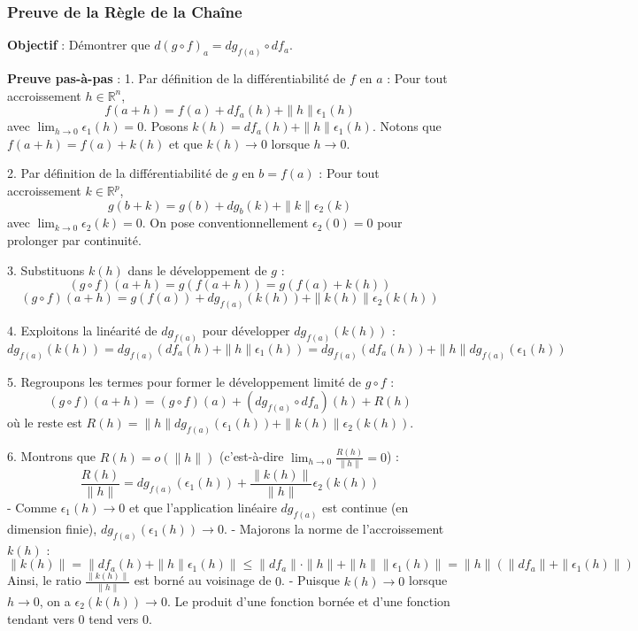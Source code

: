 \documentclass[11pt,a4paper]{article}
\begin{document}
\subsubsection{Preuve de la Règle de la Chaîne}

\textbf{Objectif} : Démontrer que $d(g \circ f)_a = dg_{f(a)} \circ df_a$.

\textbf{Preuve pas-à-pas} :
1. Par définition de la différentiabilité de $f$ en $a$ :
   Pour tout accroissement $h \in \mathbb{R}^n$,
   $$ f(a+h) = f(a) + df_a(h) + \|h\|\epsilon_1(h) $$
   avec $\lim_{h \to 0} \epsilon_1(h) = 0$.
   Posons $k(h) = df_a(h) + \|h\|\epsilon_1(h)$. Notons que $f(a+h) = f(a) + k(h)$ et que $k(h) \to 0$ lorsque $h \to 0$.

2. Par définition de la différentiabilité de $g$ en $b = f(a)$ :
   Pour tout accroissement $k \in \mathbb{R}^p$,
   $$ g(b+k) = g(b) + dg_b(k) + \|k\|\epsilon_2(k) $$
   avec $\lim_{k \to 0} \epsilon_2(k) = 0$. On pose conventionnellement $\epsilon_2(0) = 0$ pour prolonger par continuité.

3. Substituons $k(h)$ dans le développement de $g$ :
   $$ (g \circ f)(a+h) = g(f(a+h)) = g(f(a) + k(h)) $$
   $$ (g \circ f)(a+h) = g(f(a)) + dg_{f(a)}(k(h)) + \|k(h)\|\epsilon_2(k(h)) $$

4. Exploitons la linéarité de $dg_{f(a)}$ pour développer $dg_{f(a)}(k(h))$ :
   $$ dg_{f(a)}(k(h)) = dg_{f(a)}(df_a(h) + \|h\|\epsilon_1(h)) = dg_{f(a)}(df_a(h)) + \|h\| dg_{f(a)}(\epsilon_1(h)) $$

5. Regroupons les termes pour former le développement limité de $g \circ f$ :
   $$ (g \circ f)(a+h) = (g \circ f)(a) + (dg_{f(a)} \circ df_a)(h) + R(h) $$
   où le reste est $R(h) = \|h\| dg_{f(a)}(\epsilon_1(h)) + \|k(h)\|\epsilon_2(k(h))$.

6. Montrons que $R(h) = o(\|h\|)$ (c'est-à-dire $\lim_{h \to 0} \frac{R(h)}{\|h\|} = 0$) :
   $$ \frac{R(h)}{\|h\|} = dg_{f(a)}(\epsilon_1(h)) + \frac{\|k(h)\|}{\|h\|} \epsilon_2(k(h)) $$
   - Comme $\epsilon_1(h) \to 0$ et que l'application linéaire $dg_{f(a)}$ est continue (en dimension finie), $dg_{f(a)}(\epsilon_1(h)) \to 0$.
   - Majorons la norme de l'accroissement $k(h)$ :
     $$ \|k(h)\| = \|df_a(h) + \|h\|\epsilon_1(h)\| \le \|df_a\| \cdot \|h\| + \|h\| \|\epsilon_1(h)\| = \|h\| (\|df_a\| + \|\epsilon_1(h)\|) $$
     Ainsi, le ratio $\frac{\|k(h)\|}{\|h\|}$ est borné au voisinage de $0$.
   - Puisque $k(h) \to 0$ lorsque $h \to 0$, on a $\epsilon_2(k(h)) \to 0$.
   Le produit d'une fonction bornée et d'une fonction tendant vers 0 tend vers 0.
\end{document}
